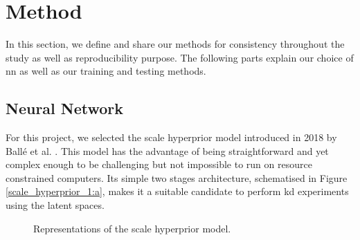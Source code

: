 \documentclass{article}
\begin{document}
\section{Method}
\label{method}
In this section, we define and share our methods for consistency throughout the study as well as reproducibility purpose. The following parts explain our choice of \acrshort{nn} as well as our training and testing methods.

\subsection{Neural Network}
For this project, we selected the scale hyperprior model introduced in 2018 by Ballé et al. \cite{balle2018variationalimagecompressionscale}. This model has the advantage of being straightforward and yet complex enough to be challenging but not impossible to run on resource constrained computers. Its simple two stages architecture, schematised in Figure \ref{scale_hyperprior_1:a}, makes it a suitable candidate to perform \acrshort{kd} experiments using the latent spaces.

\begin{figure}[H]
    \centering
    \qquad
    \caption[Representations of the scale hyperprior model.]{Representations of the scale hyperprior model.}
    \label{kd_lic_2}
\end{figure}
\end{document}
